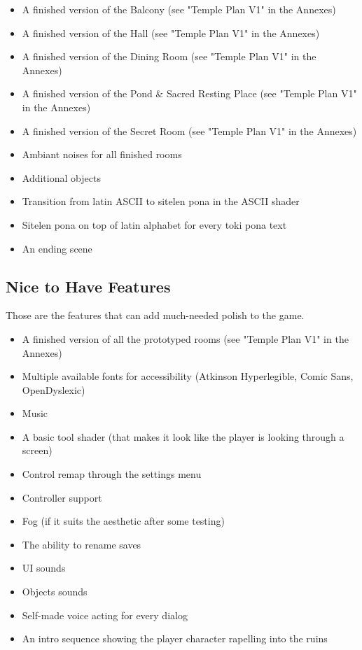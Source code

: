\documentclass{scrartcl}
\begin{document}
\begin{itemize}
				\item A finished version of the Balcony (see "Temple Plan V1" in the Annexes)
				\item A finished version of the Hall (see "Temple Plan V1" in the Annexes)
				\item A finished version of the Dining Room (see "Temple Plan V1" in the Annexes)
				\item A finished version of the Pond \& Sacred Resting Place (see "Temple Plan V1" in the Annexes)
				\item A finished version of the Secret Room (see "Temple Plan V1" in the Annexes)
				\item Ambiant noises for all finished rooms
				\item Additional objects
				\item Transition from latin ASCII to sitelen pona in the ASCII shader
				\item Sitelen pona on top of latin alphabet for every toki pona text
				\item An ending scene
			\end{itemize}
		\subsection{Nice to Have Features}
			Those are the features that can add much-needed polish to the game.
			\begin{itemize}
				\item A finished version of all the prototyped rooms (see "Temple Plan V1" in the Annexes)
				\item Multiple available fonts for accessibility (Atkinson Hyperlegible, Comic Sans, OpenDyslexic)
				\item Music
				\item A basic tool shader (that makes it look like the player is looking through a screen)
				\item Control remap through the settings menu
				\item Controller support
				\item Fog (if it suits the aesthetic after some testing)
				\item The ability to rename saves
				\item UI sounds
				\item Objects sounds
				\item Self-made voice acting for every dialog
				\item An intro sequence showing the player character rapelling into the ruins
			\end{itemize}
\end{document}
